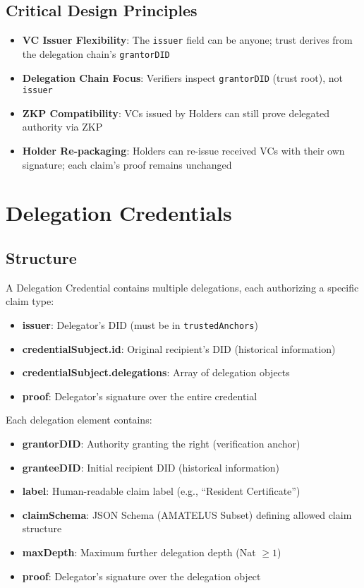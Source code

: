 \subsection{Critical Design Principles}

\begin{itemize}
  \item \textbf{VC Issuer Flexibility}: The \texttt{issuer} field can be anyone; trust derives from the delegation chain's \texttt{grantorDID}
  \item \textbf{Delegation Chain Focus}: Verifiers inspect \texttt{grantorDID} (trust root), not \texttt{issuer}
  \item \textbf{ZKP Compatibility}: VCs issued by Holders can still prove delegated authority via ZKP
  \item \textbf{Holder Re-packaging}: Holders can re-issue received VCs with their own signature; each claim's proof remains unchanged
\end{itemize}

\section{Delegation Credentials}

\subsection{Structure}

A Delegation Credential contains multiple delegations, each authorizing a specific claim type:

\begin{itemize}
  \item \textbf{issuer}: Delegator's DID (must be in \texttt{trustedAnchors})
  \item \textbf{credentialSubject.id}: Original recipient's DID (historical information)
  \item \textbf{credentialSubject.delegations}: Array of delegation objects
  \item \textbf{proof}: Delegator's signature over the entire credential
\end{itemize}

Each delegation element contains:

\begin{itemize}
  \item \textbf{grantorDID}: Authority granting the right (verification anchor)
  \item \textbf{granteeDID}: Initial recipient DID (historical information)
  \item \textbf{label}: Human-readable claim label (e.g., ``Resident Certificate'')
  \item \textbf{claimSchema}: JSON Schema (AMATELUS Subset) defining allowed claim structure
  \item \textbf{maxDepth}: Maximum further delegation depth (Nat $\geq 1$)
  \item \textbf{proof}: Delegator's signature over the delegation object
\end{itemize}

